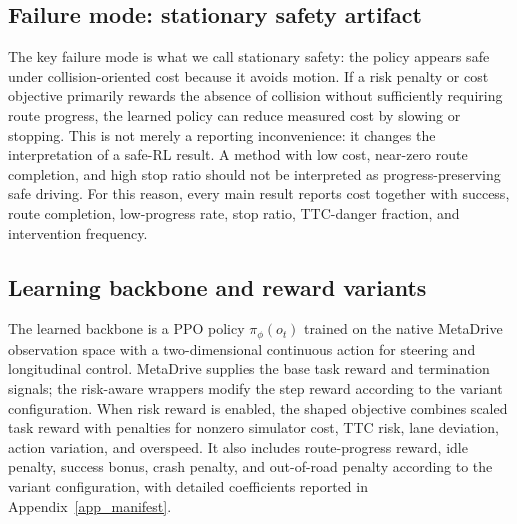 \documentclass[pdflatex,sn-mathphys-ay]{sn-jnl}
\begin{document}
\subsection{Failure mode: stationary safety artifact}\label{sec_nonmotion_method}
The key failure mode is what we call stationary safety: the policy appears safe under collision-oriented cost because it avoids motion. If a risk penalty or cost objective primarily rewards the absence of collision without sufficiently requiring route progress, the learned policy can reduce measured cost by slowing or stopping. This is not merely a reporting inconvenience: it changes the interpretation of a safe-RL result. A method with low cost, near-zero route completion, and high stop ratio should not be interpreted as progress-preserving safe driving. For this reason, every main result reports cost together with success, route completion, low-progress rate, stop ratio, TTC-danger fraction, and intervention frequency.

\subsection{Learning backbone and reward variants}\label{sec_learning_backbone}
The learned backbone is a PPO policy $\pi_\phi(o_t)$ \citep{schulman2017ppo} trained on the native MetaDrive observation space with a two-dimensional continuous action for steering and longitudinal control. MetaDrive supplies the base task reward and termination signals; the risk-aware wrappers modify the step reward according to the variant configuration. When risk reward is enabled, the shaped objective combines scaled task reward with penalties for nonzero simulator cost, TTC risk, lane deviation, action variation, and overspeed. It also includes route-progress reward, idle penalty, success bonus, crash penalty, and out-of-road penalty according to the variant configuration, with detailed coefficients reported in Appendix~\ref{app_manifest}.
\end{document}
